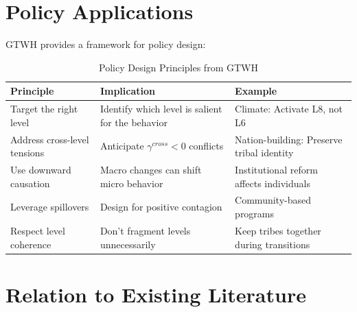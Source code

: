 \documentclass[12pt,a4paper]{article}
\begin{document}
\section{Policy Applications}
\label{sec:policy}

GTWH provides a framework for policy design:

\begin{table}[htbp]
\centering
\caption{Policy Design Principles from GTWH}
\label{tab:policy}
\renewcommand{\arraystretch}{1.3}
\begin{tabular}{@{}p{3.5cm}p{4.5cm}p{4.5cm}@{}}
\toprule
\textbf{Principle} & \textbf{Implication} & \textbf{Example} \\
\midrule
Target the right level & Identify which level is salient for the behavior & Climate: Activate L8, not L6 \\
Address cross-level tensions & Anticipate $\gamma^{cross} < 0$ conflicts & Nation-building: Preserve tribal identity \\
Use downward causation & Macro changes can shift micro behavior & Institutional reform affects individuals \\
Leverage spillovers & Design for positive contagion & Community-based programs \\
Respect level coherence & Don't fragment levels unnecessarily & Keep tribes together during transitions \\
\bottomrule
\end{tabular}
\end{table}

\section{Relation to Existing Literature}
\label{sec:literature}
\end{document}
